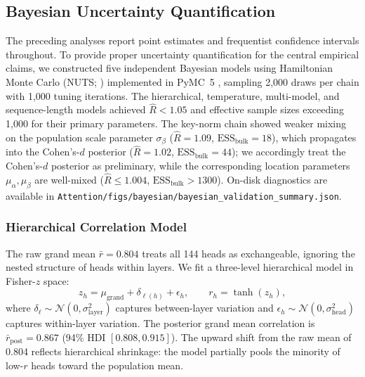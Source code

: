 \documentclass[twoside,11pt]{article}
\begin{document}
\subsection{Bayesian Uncertainty Quantification}
\label{sec:bayesian_validation_supp}

The preceding analyses report point estimates and frequentist confidence intervals throughout. To provide proper uncertainty quantification for the central empirical claims, we constructed five independent Bayesian models using Hamiltonian Monte Carlo (NUTS; \citealp{hoffman2014no}) implemented in PyMC~5 \citep{salvatier2016probabilistic}, sampling 2{,}000 draws per chain with 1{,}000 tuning iterations. The hierarchical, temperature, multi-model, and sequence-length models achieved $\hat{R} < 1.05$ and effective sample sizes exceeding 1{,}000 for their primary parameters. The key-norm chain showed weaker mixing on the population scale parameter $\sigma_\beta$ ($\hat{R} = 1.09$, $\mathrm{ESS}_{\mathrm{bulk}} = 18$), which propagates into the Cohen's-$d$ posterior ($\hat{R} = 1.02$, $\mathrm{ESS}_{\mathrm{bulk}} = 44$); we accordingly treat the Cohen's-$d$ posterior as preliminary, while the corresponding location parameters $\mu_\alpha, \mu_\beta$ are well-mixed ($\hat{R} \le 1.004$, $\mathrm{ESS}_{\mathrm{bulk}} > 1300$). On-disk diagnostics are available in \texttt{Attention/figs/bayesian/bayesian\_validation\_summary.json}.

\subsubsection{Hierarchical Correlation Model}

The raw grand mean $\bar{r} = 0.804$ treats all 144 heads as exchangeable, ignoring the nested structure of heads within layers. We fit a three-level hierarchical model in Fisher-$z$ space:
\begin{equation}
z_h = \mu_{\mathrm{grand}} + \delta_{\ell(h)} + \epsilon_h, \qquad r_h = \tanh(z_h),
\end{equation}
where $\delta_\ell \sim \mathcal{N}(0, \sigma_{\mathrm{layer}}^2)$ captures between-layer variation and $\epsilon_h \sim \mathcal{N}(0, \sigma_{\mathrm{head}}^2)$ captures within-layer variation. The posterior grand mean correlation is $\bar{r}_{\mathrm{post}} = 0.867$ (94\% HDI $[0.808, 0.915]$). The upward shift from the raw mean of 0.804 reflects hierarchical shrinkage: the model partially pools the minority of low-$r$ heads toward the population mean.
\end{document}
